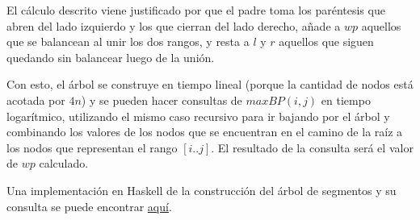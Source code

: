 \documentclass[letterpaper, 12pt]{article}
\begin{document}
\begin{enumerate}
\begin{itemize}
    El cálculo descrito viene justificado por que el padre toma los paréntesis que abren del lado izquierdo y los que cierran del lado derecho, añade a $wp$ aquellos que se balancean al unir los dos rangos, y resta a $l$ y $r$ aquellos que siguen quedando sin balancear luego de la unión.
\end{itemize}

Con esto, el árbol se construye en tiempo lineal (porque la cantidad de nodos está acotada por $4n$) y se pueden hacer consultas de $maxBP(i, j)$ en tiempo logarítmico, utilizando el mismo caso recursivo para ir bajando por el árbol y combinando los valores de los nodos que se encuentran en el camino de la raíz a los nodos que representan el rango $[i..j]$. El resultado de la consulta será el valor de $wp$ calculado.

Una implementación en Haskell de la construcción del árbol de segmentos y su consulta se puede encontrar \href{}{aquí}.

\end{enumerate} \vspace{4mm}
\end{document}
